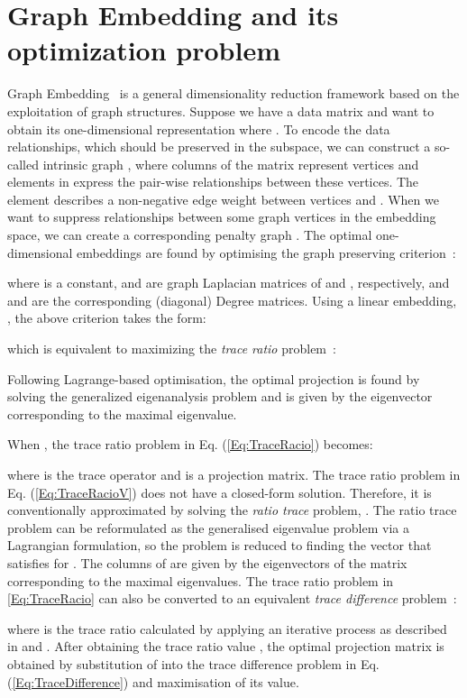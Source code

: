 \documentclass[journal]{IEEEtran}
\begin{document}
 \section{Graph Embedding and its optimization problem}\label{SS:GraphEmbedding}

Graph Embedding~\cite{yan2006mfa} is a general dimensionality reduction framework based on the exploitation of graph structures. Suppose we have a data matrix  and want to obtain its one-dimensional representation  where . To encode the data relationships, which should be preserved in the subspace, we can construct a so-called intrinsic graph , 
where columns of the matrix  represent vertices and elements in  express the pair-wise relationships between these vertices. The element  describes a non-negative edge weight between vertices  and . 
When we want to suppress relationships between some graph vertices in the embedding space, we can create a corresponding penalty graph . The optimal one-dimensional embeddings  are found by optimising the graph preserving criterion~\cite{yan2006mfa}:

where  is a constant,  and  are  graph Laplacian matrices of  and , respectively, and  and  are the corresponding (diagonal) Degree matrices. Using a linear embedding, , the above criterion takes the form:

which is equivalent to maximizing the \emph{trace ratio} problem~\cite{jia2009trace, iosfidis2013}:

Following Lagrange-based optimisation, the optimal projection  is found by solving the generalized eigenanalysis problem  and is given by the eigenvector corresponding to the maximal eigenvalue. 

When , the trace ratio problem in Eq. (\ref{Eq:TraceRacio}) becomes:

where  is the trace operator and  is a projection matrix. The trace ratio problem in Eq. (\ref{Eq:TraceRacioV}) does not have a closed-form solution. Therefore, it is conventionally approximated by solving the \emph{ratio trace} problem, . The ratio trace problem can be reformulated as the generalised eigenvalue problem via a Lagrangian formulation, so the problem is reduced to finding the vector  that satisfies  for . The columns of  are given by the eigenvectors of the matrix  corresponding to the  maximal eigenvalues.
The trace ratio problem in \cref{Eq:TraceRacio} can also be converted to an equivalent \emph{trace difference} problem~\cite{jia2009trace}:

where  is the trace ratio calculated by applying an iterative process as described in \cite{jia2009trace} and \cite{guo2003generalized}. After obtaining the trace ratio value , the optimal projection matrix  is obtained by substitution of  into the trace difference problem in Eq. (\ref{Eq:TraceDifference}) and maximisation of its value.
\end{document}
